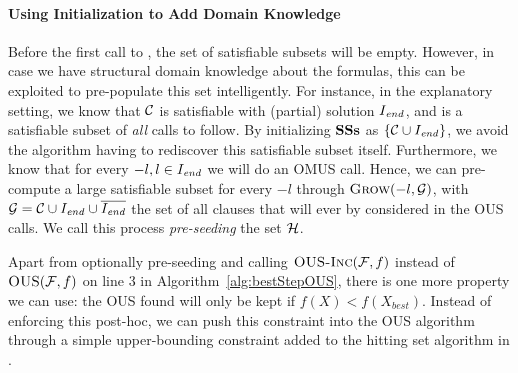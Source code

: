\paragraph{Using Initialization to Add Domain Knowledge}
Before the first call to \omusinc, the set \satsets of satisfiable subsets will be empty. 
However, in case we have structural domain knowledge about the formulas, this can be exploited to pre-populate this set intelligently. 
For instance, in the explanatory setting, we know that $\mathcal{C} $ is satisfiable with (partial) solution $I_{\mathit{end}}$, and is a satisfiable subset of \emph{all} \omusinc calls to follow. 
By initializing $\mathbf{SSs}$ as $\{\mathcal{C}  \cup I_{\mathit{end}}\}$, we avoid the algorithm having to rediscover this satisfiable subset itself.
Furthermore, we know that for every $-l, l \in I_{\mathit{end}}$ we will do an OMUS call. Hence, we can pre-compute a large satisfiable subset for every $-l$ through $\textsc{Grow}(-l, \mathcal{G} )$, with $\mathcal{G}  = {\cal C} \cup I_{\mathit{end}} \cup \overline{I_{\mathit{end}}}$ the set of all clauses that will ever by considered in the OUS calls. We call this process \textit{pre-seeding} the set $\mathcal{H} $.

Apart from optionally pre-seeding and calling $\textsc{OUS-Inc}(\mathcal{F} ,f)$ instead of $\textsc{OUS}(\mathcal{F} ,f)$ on line 3 in Algorithm~\ref{alg:bestStepOUS}, there is one more property we can use: the OUS found will only be kept if $f(X)<f(X_{best})$. Instead of enforcing this post-hoc, we can push this constraint into the OUS algorithm through a simple upper-bounding constraint added to the hitting set algorithm in \omusinc.



